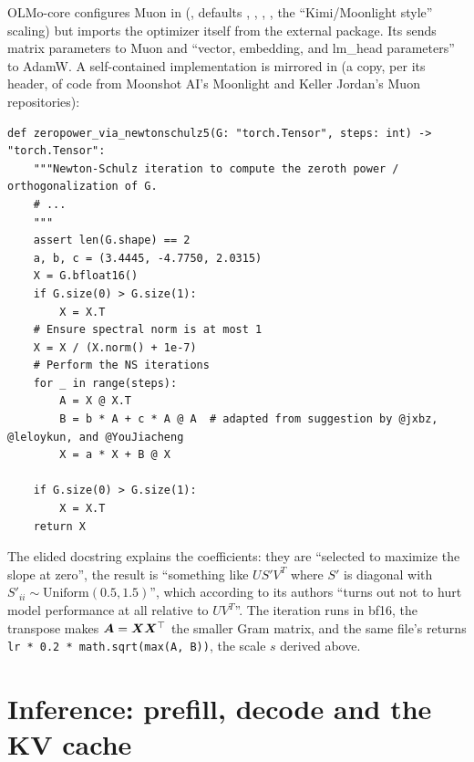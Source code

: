 \begin{implnote}[title={In the code: Muon}]
OLMo-core configures Muon in 
(, defaults , , ,
, the ``Kimi/Moonlight style'' scaling) but imports the optimizer
itself from the external  package. Its  sends
matrix parameters to Muon and ``vector, embedding, and lm\_head parameters'' to AdamW. A
self-contained implementation is mirrored in
(a copy, per its header, of code from Moonshot AI's Moonlight and Keller Jordan's Muon
repositories):
\begin{lstlisting}[caption={Excerpt from \texttt{repos/\allowbreak awslabs\_\_hybrid-model-factory/\allowbreak training/\allowbreak src/\allowbreak hmf/\allowbreak third\_party/\allowbreak muon/\allowbreak muon.py}},label={lst:c01-muon-ns}]
def zeropower_via_newtonschulz5(G: "torch.Tensor", steps: int) -> "torch.Tensor":
    """Newton-Schulz iteration to compute the zeroth power / orthogonalization of G.
    # ...
    """
    assert len(G.shape) == 2
    a, b, c = (3.4445, -4.7750, 2.0315)
    X = G.bfloat16()
    if G.size(0) > G.size(1):
        X = X.T
    # Ensure spectral norm is at most 1
    X = X / (X.norm() + 1e-7)
    # Perform the NS iterations
    for _ in range(steps):
        A = X @ X.T
        B = b * A + c * A @ A  # adapted from suggestion by @jxbz, @leloykun, and @YouJiacheng
        X = a * X + B @ X

    if G.size(0) > G.size(1):
        X = X.T
    return X
\end{lstlisting}
The elided docstring explains the coefficients: they are ``selected to maximize the slope
at zero'', the result is ``something like $US'V^T$ where $S'$ is diagonal with
$S'_{ii} \sim \mathrm{Uniform}(0.5, 1.5)$'', which according to its authors ``turns out not
to hurt model performance at all relative to $UV^T$''. The iteration runs in bf16, the
transpose makes $\bm{A} = \bm{X}\bm{X}^{\top}$ the smaller Gram matrix, and the same file's
 returns \texttt{lr * 0.2 * math.sqrt(max(A, B))}, the scale $s$
derived above.
\end{implnote}

\section{Inference: prefill, decode and the KV cache}\label{sec:c01-inference}

